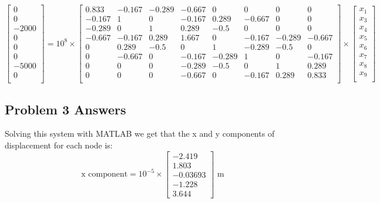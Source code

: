 \documentclass[8pt]{article}
\begin{document}
\[
\begin{bmatrix}
    0 \\
    0 \\
    -2000 \\
    0 \\
    0 \\
    0 \\
    -5000 \\
    0 \\
\end{bmatrix}
=
10^8 \times
\begin{bmatrix}
    0.833 & -0.167 & -0.289 & -0.667 & 0 & 0 & 0 & 0 \\
    -0.167 & 1 & 0 & -0.167 & 0.289 & -0.667 & 0 & 0 \\
    -0.289 & 0 & 1 & 0.289 & -0.5 & 0 & 0 & 0 \\
    -0.667 & -0.167 & 0.289 & 1.667 & 0 & -0.167 & -0.289 & -0.667 \\
    0 & 0.289 & -0.5 & 0 & 1 & -0.289 & -0.5 & 0 \\
    0 & -0.667 & 0 & -0.167 & -0.289 & 1 & 0 & -0.167 \\
    0 & 0 & 0 & -0.289 & -0.5 & 0 & 1 & 0.289 \\
    0 & 0 & 0 & -0.667 & 0 & -0.167 & 0.289 & 0.833 \\
\end{bmatrix}
\times
\begin{bmatrix}
    x_1 \\
    x_3 \\
    x_4 \\
    x_5 \\
    x_6 \\
    x_7 \\
    x_8 \\
    x_9 \\
\end{bmatrix}
\]

\subsection{Problem 3 Answers}
Solving this system with MATLAB we get that the x and y components of displacement for each node is:
\[
\text{x component} = 10^{-5} \times
\begin{bmatrix}
    -2.419 \\
    1.803 \\
    -0.03693 \\
    -1.228 \\
    3.644
\end{bmatrix} \text{ m}
\]
\end{document}
